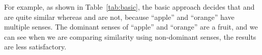 For example, as shown in Table~\ref{tab:basic}, the basic approach
decides that  and  are quite
similar whereas  and  are
not, because ``apple'' and ``orange'' have multiple senses. The
dominant senses of ``apple'' and ``orange'' are a fruit, and we can
see when we are comparing similarity using non-dominant senses, the
results are less satisfactory.


%



